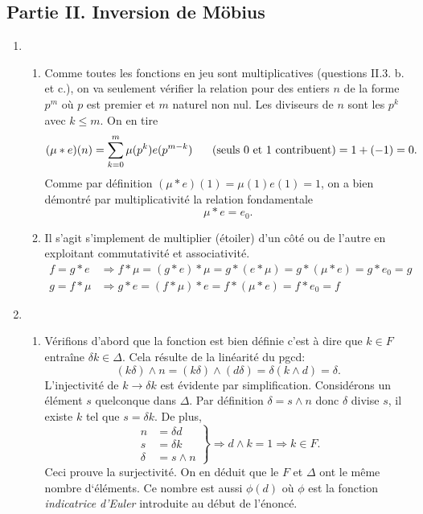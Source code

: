 \subsection*{Partie II. Inversion de Möbius}
\begin{enumerate}
 \item
\begin{enumerate}
 \item Comme toutes les fonctions en jeu sont multiplicatives (questions II.3. b. et c.), on va seulement vérifier la relation pour des entiers $n$ de la forme $p^m$ où $p$ est premier et $m$ naturel non nul.\newline
Les diviseurs de $n$ sont les $p^k$ avec $k\leq m$. On en tire
\begin{displaymath}
(\mu*e)(n) = \sum_{k=0}^{m}\mu(p^k)e(p^{m-k})\hspace{0.5cm} \text{ (seuls $0$ et $1$ contribuent)}
=  1 + (-1) = 0 .
\end{displaymath}
Comme par définition $(\mu*e)(1) = \mu(1)e(1)=1$, on a bien démontré par multiplicativité la relation fondamentale
\begin{displaymath}
 \mu * e = e_0 .
\end{displaymath}

 \item Il s'agit s'implement de multiplier (étoiler) d'un côté ou de l'autre en exploitant commutativité et associativité.
\begin{align*}
 f = g*e &\Rightarrow f*\mu = (g*e)*\mu = g*(e*\mu) = g*(\mu*e)=g*e_0=g\\
 g = f*\mu &\Rightarrow g*e = (f*\mu)*e = f*(\mu *e) = f*e_0 = f
\end{align*}
\end{enumerate}
 
 \item
\begin{enumerate}
 \item Vérifions d'abord que la fonction est bien définie c'est à dire que $k\in F$ entraîne $\delta k\in \Delta$. Cela résulte de la linéarité du pgcd:
\begin{displaymath}
 (k\delta)\wedge n = (k\delta)\wedge (d\delta) = \delta (k\wedge d) = \delta .
\end{displaymath}
L'injectivité de $k \rightarrow \delta k$ est évidente par simplification.\newline
Considérons un élément $s$ quelconque dans $\Delta$. Par définition $\delta = s\wedge n$ donc $\delta$ divise $s$, il existe $k$ tel que $s=\delta k$. De plus,
\begin{displaymath}
\left. 
\begin{aligned}
n &= \delta d\\
s &= \delta k\\
\delta &= s\wedge n 
\end{aligned}
\right\rbrace \Rightarrow d\wedge k = 1 \Rightarrow k\in F .
\end{displaymath}
Ceci prouve la surjectivité.\newline
On en déduit que le $F$ et $\Delta$ ont le même nombre d`éléments. Ce nombre est aussi $\phi(d)$ où $\phi$ est la fonction \emph{indicatrice d'Euler} introduite au début de l'énoncé.


\end{enumerate}
\end{enumerate}
